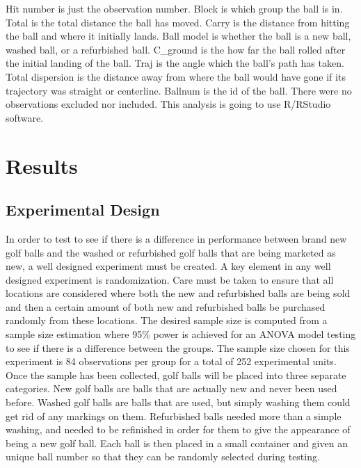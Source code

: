 \documentclass{article}\usepackage[]{graphicx}\usepackage[]{color}
\begin{document}
Hit number is just the observation number. Block is which group the ball is in. Total is the total distance the ball has moved. Carry is the distance from hitting the ball and where it initially lands. Ball model is whether the ball is a new ball, washed ball, or a refurbished ball. C\_ground is the how far the ball rolled after the initial landing of the ball. Traj is the angle which the ball's path has taken. Total dispersion is the distance away from where the ball would have gone if its trajectory was straight or centerline. Ballnum is the id of the ball. 
There were no observations excluded nor included. This analysis is going to use R/RStudio software.

\section*{Results}
\subsection*{Experimental Design}

In order to test to see if there is a difference in performance between brand new golf balls and the washed or refurbished golf balls that are being marketed as new, a well designed experiment must be created. A key element in any well designed experiment is randomization. Care must be taken to ensure that all locations are considered where both the new and refurbished balls are being sold and then a certain amount of both new and refurbished balls be purchased randomly from these locations. The desired sample size is computed from a sample size estimation where 95\% power is achieved for an ANOVA model testing to see if there is a difference between the groups. The sample size chosen for this experiment is 84 observations per group for a total of 252 experimental units. Once the sample has been collected, golf balls will be placed into three separate categories. New golf balls are balls that are actually new and never been used before. Washed golf balls are balls that are used, but simply washing them could get rid of any markings on them. Refurbished balls needed more than a simple washing, and needed to be refinished in order for them to give the appearance of being a new golf ball. Each ball is then placed in a small container and given an unique ball number so that they can be randomly selected during testing.
\end{document}
